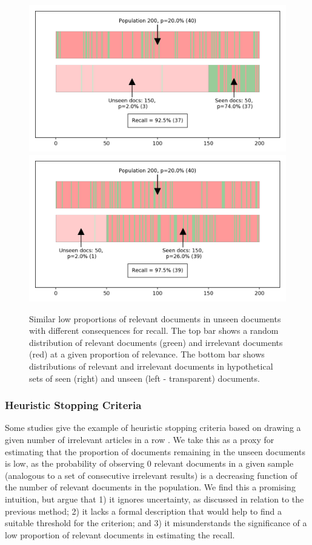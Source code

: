 \documentclass{bmcart}
\begin{document}
	\begin{figure}
		\includegraphics[width=\linewidth]{2_figs_proportions_1.png}
		\includegraphics[width=\linewidth]{2_figs_proportions_2.png}
		\caption{Similar low proportions of relevant documents in unseen documents with different consequences for recall. The top bar shows a random distribution of relevant documents (green) and irrelevant documents (red) at a given proportion of relevance. The bottom bar  shows distributions of relevant and irrelevant documents in hypothetical sets of seen (right) and unseen (left - transparent) documents.}
		\label{unseen-proportions}
	\end{figure}
	
	
	
	\subsubsection*{Heuristic Stopping Criteria}
	
	Some studies give the example of heuristic stopping criteria based on drawing a given number of irrelevant articles in a row \cite{Jonnalagadda2013, Przybya2018}. 
	We take this as a proxy for estimating that the proportion of documents remaining in the unseen documents is low, as the probability of observing 0 relevant documents in a given sample (analogous to a set of consecutive irrelevant results) is a decreasing function of the number of relevant documents in the population.
	We find this a promising intuition, but argue that 1) it ignores uncertainty, as discussed in relation to the previous method; 
	2) it lacks a formal description that would help to find a suitable threshold for the criterion; and 3) it misunderstands the significance of a low proportion of relevant documents in estimating the recall.
	
\end{document}
